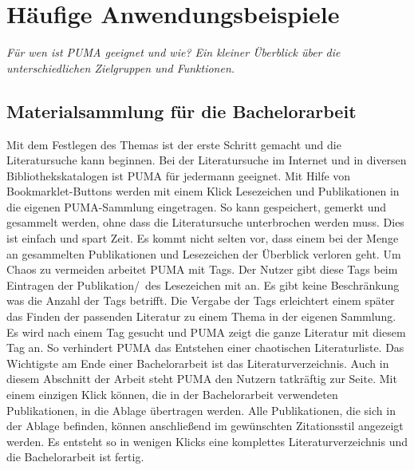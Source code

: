 \chapter{Häufige Anwendungsbeispiele}
\textit{Für wen ist PUMA geeignet und wie? Ein kleiner Überblick über die unterschiedlichen Zielgruppen und Funktionen.}
\section{Materialsammlung für die Bachelorarbeit}
Mit dem Festlegen des Themas ist der erste Schritt gemacht und die Literatursuche kann beginnen. Bei der Literatursuche im Internet und in diversen Bibliothekskatalogen ist PUMA für jedermann geeignet. Mit Hilfe von Bookmarklet-Buttons werden mit einem Klick Lesezeichen und Publikationen in die eigenen PUMA-Sammlung eingetragen. So kann gespeichert, gemerkt und gesammelt werden, ohne dass die Literatursuche unterbrochen werden muss. Dies ist einfach und spart Zeit. 
 \newline
Es kommt nicht selten vor, dass einem bei der Menge an gesammelten Publikationen und Lesezeichen der Überblick verloren geht. Um Chaos zu vermeiden arbeitet PUMA mit Tags. Der Nutzer gibt diese Tags beim Eintragen der Publikation/~des Lesezeichen mit an. Es gibt keine Beschränkung was die Anzahl der Tags betrifft. Die Vergabe der Tags erleichtert einem später das Finden der passenden Literatur zu einem Thema in der eigenen Sammlung. Es wird nach einem Tag gesucht und PUMA zeigt die ganze Literatur mit diesem Tag an. So verhindert PUMA das Entstehen einer chaotischen Literaturliste.
 \newline
Das Wichtigste am Ende einer Bachelorarbeit ist das Literaturverzeichnis. Auch in diesem Abschnitt der Arbeit steht PUMA den Nutzern tatkräftig zur Seite. Mit einem einzigen Klick können, die in der Bachelorarbeit verwendeten Publikationen, in die Ablage übertragen werden. Alle Publikationen, die sich in der Ablage befinden, können anschließend im gewünschten Zitationsstil  angezeigt werden. Es entsteht so in wenigen Klicks eine komplettes Literaturverzeichnis und die  Bachelorarbeit ist fertig.
 
